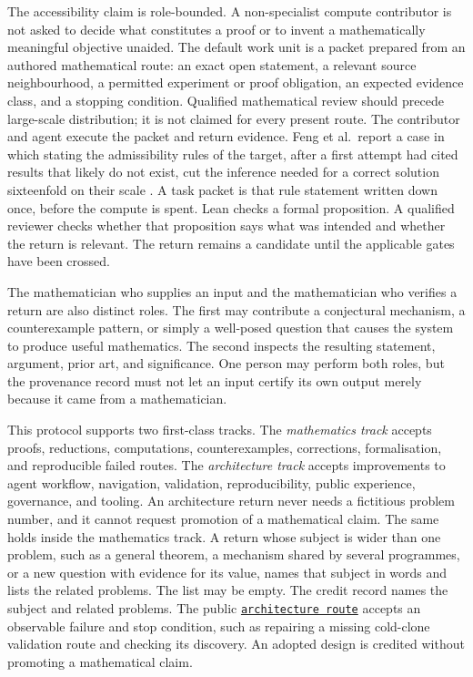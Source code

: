 \documentclass[10pt]{article}
\newcommand{\repobase}{https://github.com/wcook04/plectis-erdos}
\newcommand{\repolink}[2]{\href{\repobase/blob/402497d8e1ae025518ee34190664e8f67aa40f93/#1}{\texttt{#2}}}
\begin{document}
The accessibility claim is role-bounded.  A non-specialist compute
contributor is not asked to decide what constitutes a proof or to invent a
mathematically meaningful objective unaided.  The default work unit is a
packet prepared from an authored mathematical route: an exact open statement,
a relevant source neighbourhood, a permitted
experiment or proof obligation, an expected evidence class, and a stopping
condition.  Qualified mathematical review should precede large-scale
distribution; it is not claimed for every present route.  The contributor and
agent execute the packet and return evidence.  Feng et al.\ report a case in
which stating the admissibility rules of the target, after a first attempt
had cited results that likely do not exist, cut the inference needed for a
correct solution sixteenfold on their scale \cite{autonomousmath}.  A task
packet is that rule statement written down once, before the compute is
spent.
Lean checks a formal proposition.  A qualified reviewer checks whether that
proposition says what was intended and whether the return is relevant.  The
return remains a candidate until the applicable gates have been crossed.

The mathematician who supplies an input and the mathematician who verifies a
return are also distinct roles.  The first may contribute a conjectural
mechanism, a counterexample pattern, or simply a well-posed question that
causes the system to produce useful mathematics.  The second inspects the
resulting statement, argument, prior art, and significance.  One person may
perform both roles, but the provenance record must not let an input certify
its own output merely because it came from a mathematician.

This protocol supports two first-class tracks.  The \emph{mathematics track}
accepts proofs, reductions, computations, counterexamples, corrections,
formalisation, and reproducible failed routes.  The \emph{architecture track}
accepts improvements to agent workflow, navigation, validation,
reproducibility, public experience, governance, and tooling.  An architecture
return never needs a fictitious problem number, and it cannot request
promotion of a mathematical claim.  The same holds inside the mathematics
track.  A return whose subject is wider than one problem, such as a general
theorem, a mechanism shared by several programmes, or a new question with
evidence for its value, names that subject in words and lists the related
problems.  The list may be empty. The credit record names the subject and related
problems. The public
\repolink{docs/research-commons/ARCHITECTURE_CONTRIBUTIONS.md}{architecture route}
accepts an observable failure and stop condition, such as repairing a missing
cold-clone validation route and checking its discovery. An adopted design is
credited without promoting a mathematical claim.
\end{document}
